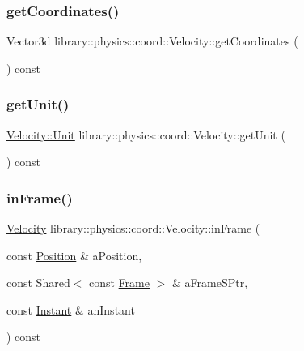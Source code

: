 \mbox{\label{classlibrary_1_1physics_1_1coord_1_1_velocity_a1ac18f97a304ac026c2544292b89e030}} 
\subsubsection{\texorpdfstring{get\+Coordinates()}{getCoordinates()}}
{\footnotesize\ttfamily Vector3d library\+::physics\+::coord\+::\+Velocity\+::get\+Coordinates (\begin{DoxyParamCaption}{ }\end{DoxyParamCaption}) const}

\mbox{\label{classlibrary_1_1physics_1_1coord_1_1_velocity_aa04a5b82a46d5ea4e92bf53046a18494}} 
\subsubsection{\texorpdfstring{get\+Unit()}{getUnit()}}
{\footnotesize\ttfamily \hyperlink{classlibrary_1_1physics_1_1coord_1_1_velocity_a8bbc811932c454dbe0ab8b56f1b2c0b3}{Velocity\+::\+Unit} library\+::physics\+::coord\+::\+Velocity\+::get\+Unit (\begin{DoxyParamCaption}{ }\end{DoxyParamCaption}) const}

\mbox{\label{classlibrary_1_1physics_1_1coord_1_1_velocity_a2c6cf9ff38a1352b3e87578e0d2cb132}} 
\subsubsection{\texorpdfstring{in\+Frame()}{inFrame()}}
{\footnotesize\ttfamily \hyperlink{classlibrary_1_1physics_1_1coord_1_1_velocity}{Velocity} library\+::physics\+::coord\+::\+Velocity\+::in\+Frame (\begin{DoxyParamCaption}\item[{const \hyperlink{classlibrary_1_1physics_1_1coord_1_1_position}{Position} \&}]{a\+Position,  }\item[{const Shared$<$ const \hyperlink{classlibrary_1_1physics_1_1coord_1_1_frame}{Frame} $>$ \&}]{a\+Frame\+S\+Ptr,  }\item[{const \hyperlink{classlibrary_1_1physics_1_1time_1_1_instant}{Instant} \&}]{an\+Instant }\end{DoxyParamCaption}) const}

